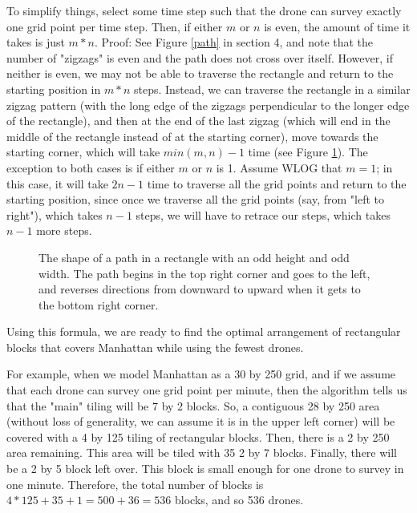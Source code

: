 \documentclass{article}
\begin{document}
To simplify things, select some time step such that the drone can survey exactly one grid point per time step. Then, if either $m$ or $n$ is even, the amount of time it takes is just $m*n$. Proof: See Figure \ref{path} in section 4, and note that the number of "zigzags" is even and the path does not cross over itself. However, if neither is even, we may not be able to traverse the rectangle and return to the starting position in $m*n$ steps. Instead, we can traverse the rectangle in a similar zigzag pattern (with the long edge of the zigzags perpendicular to the longer edge of the rectangle), and then at the end of the last zigzag (which will end in the middle of the rectangle instead of at the starting corner), move towards the starting corner, which will take $min(m,n) - 1$ time (see Figure \ref{path2}). The exception to both cases is if either $m$ or $n$ is 1. Assume WLOG that $m = 1$; in this case, it will take $2n - 1$ time to traverse all the grid points and return to the starting position, since once we traverse all the grid points (say, from "left to right"), which takes $n - 1$ steps, we will have to retrace our steps, which takes $n-1$ more steps.

\begin{figure}[htb!]
    \caption{The shape of a path in a rectangle with an odd height and odd width. The path begins in the top right corner and goes to the left, and reverses directions from downward to upward when it gets to the bottom right corner.}
    \label{path2}
\end{figure}

Using this formula, we are ready to find the optimal arrangement of rectangular blocks that covers Manhattan while using the fewest drones.

For example, when we model Manhattan as a 30 by 250 grid, and if we assume that each drone can survey one grid point per minute, then the algorithm tells us that the "main" tiling will be 7 by 2 blocks. So, a contiguous 28 by 250 area (without loss of generality, we can assume it is in the upper left corner) will be covered with a 4 by 125 tiling of rectangular blocks. Then, there is a 2 by 250 area remaining. This area will be tiled with 35 2 by 7 blocks. Finally, there will be a 2 by 5 block left over. This block is small enough for one drone to survey in one minute. Therefore, the total number of blocks is $4*125 + 35 + 1 = 500 + 36 = 536$ blocks, and so 536 drones.
\end{document}

